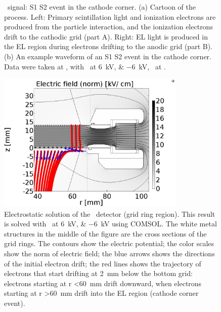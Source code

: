 \begin{figure}[!htbp]
\begin{subfigure}[b]{0.7\textwidth}
		\caption{}
		\label{fig:cathode corner c}
	\end{subfigure}
	\caption[\gtest\ signal: S1 S2 event in the cathode corner.]{\gtest\ signal: S1 S2 event in the cathode corner. (a) Cartoon of the process. Left: Primary scintillation light and ionization electrons are produced from the particle interaction, and the ionization electrons drift to the cathodic grid (part A). Right: EL light is produced in the EL region during electrons drifting to the anodic grid (part B). (b) An example waveform of an S1 S2 event in the cathode corner. Data were taken at , with \opvtvb\ at \SIlist{+6;-6}{kV}, \opgd\ at \standarddensity .%
	}
	\label{fig:cathode corner}
\end{figure}

\begin{figure}[!htbp]
	\centering
	\includegraphics[width=0.8\textwidth,clip,trim={0 0 0 0},angle=0,origin=c]{Figures/GasTest/Comsol/ComsolCathodeCorner.jpg}
	\caption[Electrostatic solution of the \gtest\ detector (grid ring region).]{Electrostatic solution of the \gtest\ detector (grid ring region). This result is solved with \opvtvb\ at \SIlist{+6;-6}{kV} using COMSOL. The white metal structures in the middle of the figure are the cross sections of the grid rings. The contours show the electric potential; the color scales show the norm of electric field; the blue arrows shows the directions of the initial electron drift; the red lines shows the trajectory of electrons that start drifting at \SI{2}{\mm} below the bottom grid: electrons starting at r \SI{<60}{\mm} drift downward, when electrons starting at r \SI{>60}{\mm} drift into the EL region (cathode corner event).}
	\label{fig:gtest Comsol cathode corner}
\end{figure}

